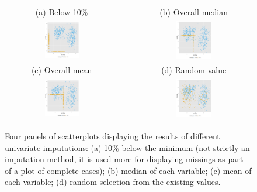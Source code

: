 \documentclass[article]{jss}
\begin{document}
\begin{center}
\begin{figure}[h]
\begin{centering}
\begin{tabular}{cccc}
{\tiny{(a) Below 10\%}} &  &  & {\tiny{(b) Overall median}}\tabularnewline
\includegraphics[width=0.32\textwidth]{graph/fig3-1-below10} &  &  & \includegraphics[width=0.32\textwidth]{graph/fig3-2-median}\tabularnewline
{\tiny{(c) Overall mean}} &  &  & {\tiny{(d) Random value}}\tabularnewline
\includegraphics[width=0.32\textwidth]{graph/fig3-3-mean} &  &  & \includegraphics[width=0.32\textwidth]{graph/fig3-4-random}\tabularnewline
\end{tabular}
\par\end{centering}
\caption{Four panels of scatterplots displaying the results of different univariate imputations: (a) 10\% below the minimum (not strictly an imputation method, it is used more for displaying missings as part of a plot of complete cases); (b) median of each variable; (c) mean of each variable; (d) random selection from the existing values.}
\label{fig:univariate-imputation}
\end{figure}
\par\end{center}
\end{document}
